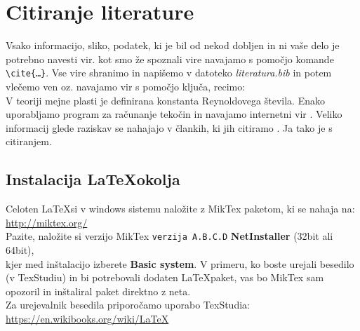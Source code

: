 \documentclass[11pt,a4]{article}
\begin{document}
\section{Citiranje literature}
Vsako informacijo, sliko, podatek, ki je bil od nekod dobljen in ni vaše delo je potrebno navesti vir. kot smo že spoznali vire navajamo s pomočjo komande \texttt{\textbackslash cite\{\ldots\}}. Vse vire shranimo in napišemo v datoteko \textit{literatura.bib} in potem vlečemo ven oz. navajamo vir s pomočjo ključa, recimo:\\
V teoriji mejne plasti \cite{boundary_layer_theory} je definirana konstanta Reynoldovega števila. Enako uporabljamo program za računanje tekočin \cite{openfoam} in navajamo internetni vir \cite{cfd_online_skin_friction}. Veliko informacij glede raziskav se nahajajo v člankih, ki jih citiramo \cite{bird_et_all}. Ja tako je s citiranjem.

\subsection{Instalacija \LaTeX okolja}
Celoten \LaTeX si v windows sistemu naložite z MikTex paketom, ki se nahaja na:\\[0.2cm]
\url{http://miktex.org/}\\[0.2cm]
Pazite, naložite si verzijo MikTex \texttt{verzija A.B.C.D} \textbf{NetInstaller} (32bit ali 64bit),\\[0.2cm]
kjer med inštalacijo izberete \textbf{Basic system}. V primeru, ko boste urejali besedilo (v TexStudiu) in bi potrebovali dodaten \LaTeX paket, vas bo MikTex sam opozoril in inštaliral paket direktno z neta.\\[0.5cm]

Za urejevalnik besedila priporočamo uporabo TexStudia:\\[0.2cm]
\url{https://en.wikibooks.org/wiki/LaTeX}


\newpage


\end{document}

